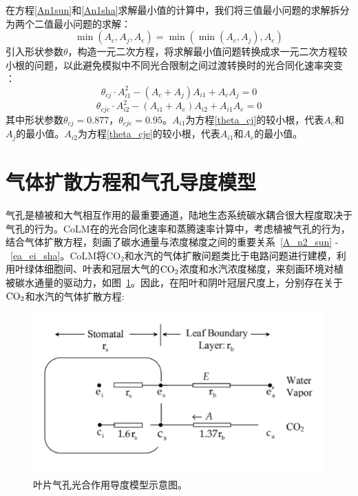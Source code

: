在方程\eqref{An1sun}和\eqref{An1sha}求解最小值的计算中，我们将三值最小问题的求解拆分为两个二值最小问题的求解：
\begin{equation}\label{min_Ac_Aj_Ae}
\min \left(A_{c}, A_{j}, A_{e}\right)=\min \left(\min \left(A_{c}, A_{j}\right), A_{e}\right)
\end{equation}
引入形状参数$\theta$，构造一元二次方程，将求解最小值问题转换成求一元二次方程较小根的问题，以此避免模拟中不同光合限制之间过渡转换时的光合同化速率突变 \citep{collatz1991,collatz1992}：
\begin{equation}\label{theta_cj}
\theta_{c j} \cdot A_{i1}^{2}-\left(A_{c}+A_{j}\right) A_{i1}+A_{c} A_{j}=0
\end{equation}
\begin{equation}\label{theta_cje}
\theta_{c j e} \cdot A_{i2}^{2}-\left(A_{i1}+A_{e}\right) A_{i2}+A_{i1} A_{e}=0
\end{equation}
其中形状参数$\theta_{cj}=0.877$，$\theta_{cje}=0.95$。$A_{i1}$为方程\eqref{theta_cj}的较小根，代表$A_c$和$A_j$的最小值。$A_{i2}$为方程\eqref{theta_cje}的较小根，代表$A_{i1}$和$A_e$的最小值。


\section{气体扩散方程和气孔导度模型}\label{气体扩散方程和气孔导度模型}
气孔是植被和大气相互作用的最重要通道，陆地生态系统碳水耦合很大程度取决于气孔的行为。CoLM在的光合同化速率和蒸腾速率计算中，考虑植被气孔的行为，结合气体扩散方程，刻画了碳水通量与浓度梯度之间的重要关系~\eqref{A_n2_sun} -~\eqref{ea_ei_sha}。CoLM将CO$_2$和水汽的气体扩散问题类比于电路问题进行建模，利用叶绿体细胞间、叶表和冠层大气的$\rm CO_2$浓度和水汽浓度梯度，来刻画环境对植被碳水通量的驱动力，如图~\ref{fig:叶片气孔光合作用导度模型示意图}。因此，在阳叶和阴叶冠层尺度上，分别存在关于$\rm CO_2$和水汽的气体扩散方程:

{
\begin{figure}[htbp]
\centering
\includegraphics{Figures/气孔导度和光合作用/叶片气孔光合作用导度模型示意图.png}
\caption{叶片气孔光合作用导度模型示意图。}
\label{fig:叶片气孔光合作用导度模型示意图}
\end{figure}
}

